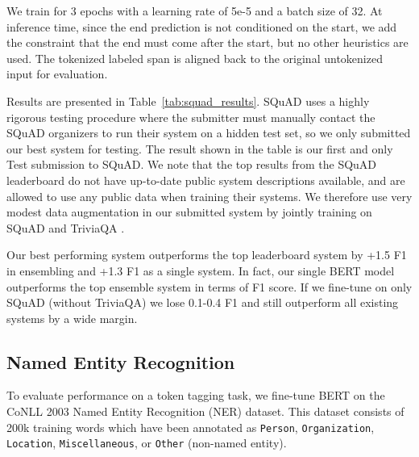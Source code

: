 We train for 3 epochs with a learning rate of 5e-5 and a batch size of 32. At inference time, since the end prediction is not conditioned on the start, we add the constraint that the end must come after the start, but no other heuristics are used. The tokenized labeled span is aligned back to the original untokenized input for evaluation.

Results are presented in Table~\ref{tab:squad_results}. SQuAD uses a highly rigorous testing procedure where the submitter must manually contact the SQuAD organizers to run their system on a hidden test set, so we only submitted our best system for testing. The result shown in the table is our first and only Test submission to SQuAD. We note that the top results from the SQuAD leaderboard do not have up-to-date public system descriptions available, and are allowed to use any public data when training their systems. We therefore use very modest data augmentation in our submitted system by jointly training on SQuAD and TriviaQA \cite{joshi-etal:2017:_triviaq}.

Our best performing system outperforms the top leaderboard system by +1.5 F1 in ensembling and +1.3 F1 as a single system. In fact, our single BERT model outperforms the top ensemble system in terms of F1 score. If we fine-tune on only SQuAD (without TriviaQA) we lose 0.1-0.4 F1 and still outperform all existing systems by a wide margin.

\subsection{Named Entity Recognition}
\label{sec:ner}

To evaluate performance on a token tagging task, we fine-tune BERT on the CoNLL 2003 Named Entity Recognition (NER) dataset. This dataset consists of 200k training words which have been annotated as {\tt {\small Person}}, {\tt {\small Organization}}, {\tt {\small Location}}, {\tt {\small Miscellaneous}}, or {\tt {\small Other}} (non-named entity).

